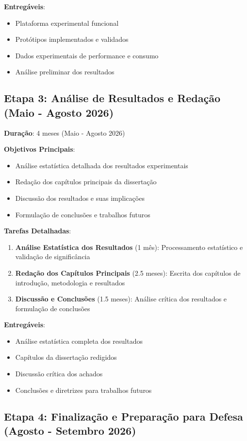 \textbf{Entregáveis}:
\begin{itemize}
\item Plataforma experimental funcional
\item Protótipos implementados e validados
\item Dados experimentais de performance e consumo
\item Análise preliminar dos resultados
\end{itemize}

\subsection{Etapa 3: Análise de Resultados e Redação (Maio - Agosto 2026)}

\textbf{Duração}: 4 meses (Maio - Agosto 2026)

\textbf{Objetivos Principais}:
\begin{itemize}
\item Análise estatística detalhada dos resultados experimentais
\item Redação dos capítulos principais da dissertação
\item Discussão dos resultados e suas implicações
\item Formulação de conclusões e trabalhos futuros
\end{itemize}

\textbf{Tarefas Detalhadas}:
\begin{enumerate}
\item \textbf{Análise Estatística dos Resultados} (1 mês): Processamento estatístico e validação de significância
\item \textbf{Redação dos Capítulos Principais} (2.5 meses): Escrita dos capítulos de introdução, metodologia e resultados
\item \textbf{Discussão e Conclusões} (1.5 meses): Análise crítica dos resultados e formulação de conclusões
\end{enumerate}

\textbf{Entregáveis}:
\begin{itemize}
\item Análise estatística completa dos resultados
\item Capítulos da dissertação redigidos
\item Discussão crítica dos achados
\item Conclusões e diretrizes para trabalhos futuros
\end{itemize}

\subsection{Etapa 4: Finalização e Preparação para Defesa (Agosto - Setembro 2026)}

